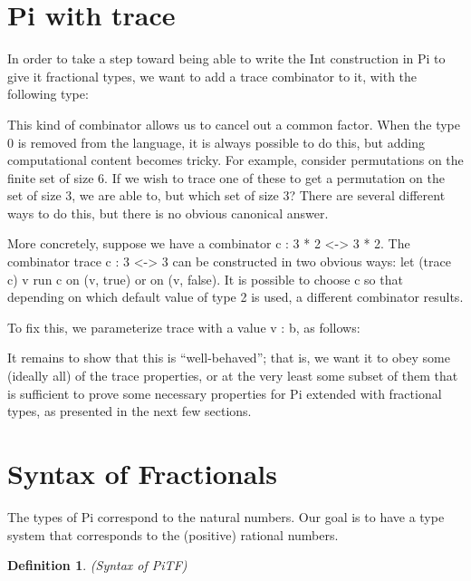 \documentclass{sigplanconf}
\newtheorem{definition}[theorem]{Definition}
\begin{document}
\section{ {{Pi}} with trace}

In order to take a step toward being able to write the Int construction in
{{Pi}} to give it fractional types, we want to add a trace combinator to it,
with the following type:


This kind of combinator allows us to cancel out a common factor. When the type
{{0}} is removed from the language, it is always possible to do this, but adding
computational content becomes tricky. For example, consider permutations on the
finite set of size {{6}}. If we wish to trace one of these to get a permutation
on the set of size {{3}}, we are able to, but which set of size {{3}}? There
are several different ways to do this, but there is no obvious canonical answer.

More concretely, suppose we have a combinator {{c : 3 * 2 <-> 3 * 2}}. The
combinator {{trace c : 3 <-> 3}} can be constructed in two obvious ways: let
{{(trace c) v}} run {{c}} on {{(v, true)}} or on {{(v, false)}}. It is possible
to choose {{c}} so that depending on which default value of type {{2}} is used,
a different combinator results.

To fix this, we parameterize {{trace}} with a value {{v : b}}, as follows:


It remains to show that this is ``well-behaved''; that is, we want it to obey
some (ideally all) of the trace properties, or at the very least some subset of
them that is sufficient to prove some necessary properties for {{Pi}} extended
with fractional types, as presented in the next few sections.


\section{Syntax of Fractionals}

The types of {{Pi}} correspond to the natural numbers. Our goal is to have a
type system that corresponds to the (positive) rational numbers. 

\begin{definition}{(Syntax of {{PiTF}})}
\label{def:PiTF}
%
\end{definition}
\end{document}
